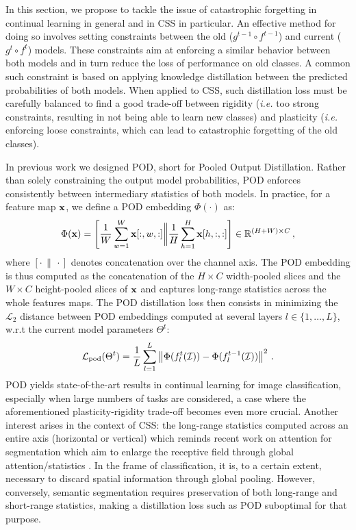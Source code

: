 In this section, we propose to tackle the issue of catastrophic forgetting in continual learning in
general and in \ac{CSS} in particular. An effective method for doing so involves setting constraints
between the old ($g^{t-1} \circ f^{t-1}$) and current ($g^{t} \circ f^{t}$) models. These
constraints aim at enforcing a similar behavior between both models and in turn reduce the loss of
performance on old classes. A common such constraint is based on applying knowledge distillation
\cite{hinton2015knowledge_distillation,li2018lwf} between the predicted probabilities of both
models. When applied to \ac{CSS}, such distillation loss must be carefully balanced to find a good
trade-off between rigidity (\textit{i.e.} too strong constraints, resulting in not being able to
learn new classes) and plasticity (\textit{i.e.} enforcing loose constraints, which can lead to
catastrophic forgetting of the old classes).


In previous work \cite{douillard2020podnet} we designed POD, short for Pooled Output Distillation.
Rather than solely constraining the output model probabilities, POD enforces consistently between
intermediary statistics of both models. In practice, for a feature map $\mathbf{x}$, we define a POD
embedding $\Phi(\cdot)$ as:
%
\begin{equation}
    \Phi(\mathbf{x}) = \left[\frac{1}{W} \sum_{w=1}^W \mathbf{x}[:,w,:] \bigg\Vert \frac{1}{H} \sum_{h=1}^H \mathbf{x}[h,:,:]\right] \in \mathbb{R}^{(H + W) \times C}\,,
    \label{eq:seg_pod_embedding}
\end{equation}
%
where $[\cdot\,\|\,\cdot]$ denotes concatenation over the channel axis. The POD embedding is thus
computed as the concatenation of the $H \times C$ width-pooled slices and the $W \times C$
height-pooled slices of $\mathbf{x}$ and captures long-range statistics across the whole features maps. The
POD distillation loss then consists in minimizing the $\mathcal{L}_2$ distance between POD
embeddings computed at several layers $l \in \{1, \dots, L\}$, w.r.t the current model parameters
$\Theta^t$:
%
\begin{equation}
    \mathcal{L}_\text{pod}(\Theta^t) = \frac{1}{L} \sum_{l = 1}^L \left\Vert  \Phi(f^t_l(\mathcal{I})) -  \Phi(f^{t-1}_l(\mathcal{I})) \right\Vert^2\,.
    \label{eq:seg_pod_loss}
\end{equation}
%
POD yields state-of-the-art results in continual learning for image classification, especially when
large numbers of tasks are considered, a case where the aforementioned plasticity-rigidity trade-off
becomes even more crucial. Another interest arises in the context of \ac{CSS}: the long-range statistics
computed across an entire axis (horizontal or vertical) which reminds recent work on attention for
segmentation \cite{wang2020axialdeeplab,huang2020ccnet,park2020csc} which aim to enlarge the
receptive field through global attention/statistics \cite{wang2020axialdeeplab}. In the frame of
classification, it is, to a certain extent, necessary to discard spatial information through global
pooling. However, conversely, semantic segmentation requires preservation of both long-range and
short-range statistics, making a distillation loss such as POD suboptimal for that purpose.


